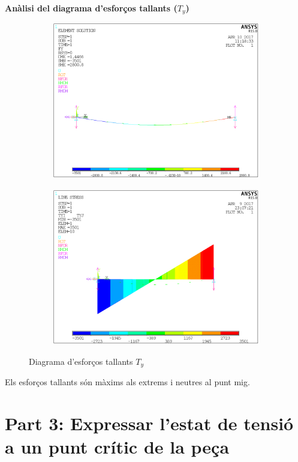 \documentclass[a4paper]{article}
\def\imgS{0.42\textwidth}
\begin{document}
\textbf{Anàlisi del diagrama d'esforços tallants ($T_y$)}
\begin{figure}[H]
	\begin{subfigure}{\imgS}
		\includegraphics[width=\textwidth]{images/b_TY}
	\end{subfigure}
	\hfill
	\begin{subfigure}{\imgS}
		\includegraphics[width=\textwidth]{images/b_TY_path}
	\end{subfigure}
	\caption{Diagrama d'esforços tallants $T_y$}
\end{figure}
Els esforços tallants són màxims als extrems i neutres al punt mig.

\section{Part 3: Expressar l'estat de tensió a un punt crític de la peça}
\end{document}
